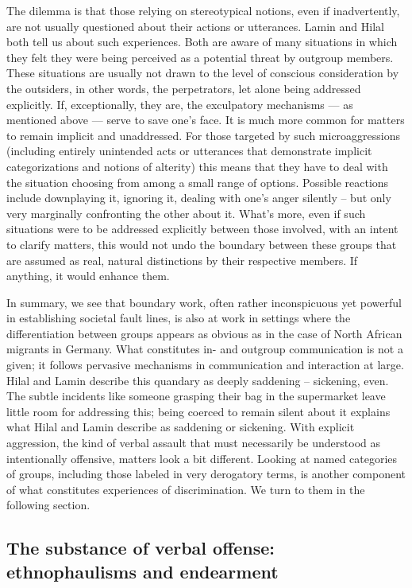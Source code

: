 \documentclass[output=paper,colorlinks,citecolor=brown]{langscibook}
\begin{document}
The dilemma is that those relying on stereotypical notions, even if inadvertently, are not usually questioned about their actions or utterances. Lamin and Hilal both tell us about such experiences. Both are aware of many situations in which they felt they were being perceived as a potential threat by outgroup members. These situations are usually not drawn to the level of conscious consideration by the outsiders, in other words, the perpetrators, let alone being addressed explicitly. If, exceptionally, they are, the exculpatory mechanisms --- as mentioned above --- serve to save one's face. It is much more common for matters to remain implicit and unaddressed. For those targeted by such microaggressions (including entirely unintended acts or utterances that demonstrate implicit categorizations and notions of alterity) this means that they have to deal with the situation choosing from among a small range of options. Possible reactions include downplaying it, ignoring it, dealing with one's anger silently -- but only very marginally confronting the other about it. What's more, even if such situations were to be addressed explicitly between those involved, with an intent to clarify matters, this would not undo the boundary between these groups that are assumed as real, natural distinctions by their respective members. If anything, it would enhance them. 

In summary, we see that boundary work, often rather inconspicuous yet powerful in establishing societal fault lines, is also at work in settings where the differentiation between groups appears as obvious as in the case of North African migrants in Germany. What constitutes in- and outgroup communication is not a given; it follows pervasive mechanisms in communication and interaction at large. Hilal and Lamin describe this quandary as deeply saddening -- sickening, even. The subtle incidents like someone grasping their bag in the supermarket leave little room for addressing this; being coerced to remain silent about it explains what Hilal and Lamin describe as saddening or sickening. With explicit aggression, the kind of verbal assault that must necessarily be understood as intentionally offensive, matters look a bit different. Looking at named categories of groups, including those labeled in very derogatory terms, is another component of what constitutes experiences of discrimination. We turn to them in the following section.

\subsection{The substance of verbal offense: ethnophaulisms and endearment}\label{CH1.1.ss.4.3}
\end{document}
